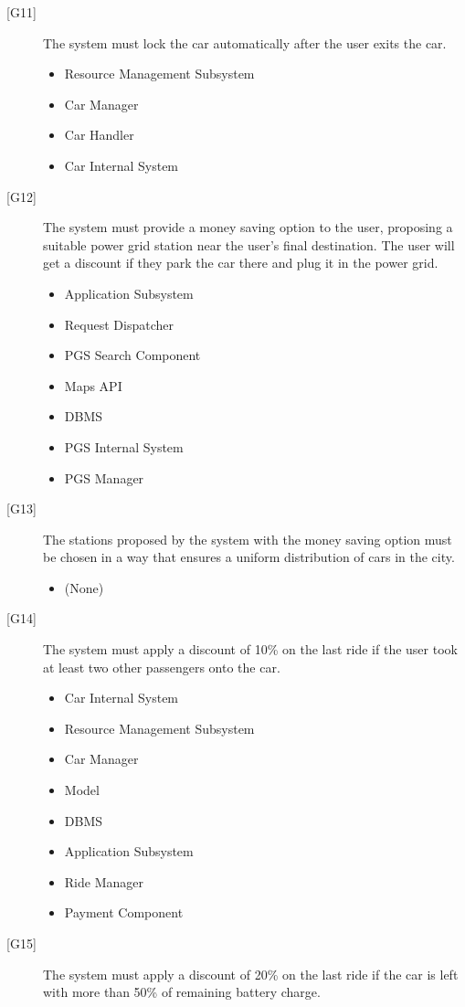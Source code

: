 \documentclass[english]{article}
\begin{document}
\begin{description}
\begin{itemize}
	\end{itemize}
	\item[{[G11]}]{The system must lock the car automatically after the user exits the car.}
	\begin{itemize}
		\item{Resource Management Subsystem}
		\item{Car Manager}
		\item{Car Handler}
		\item{Car Internal System}
	\end{itemize}
	\item[{[G12]}]{The system must provide a money saving option to the user, proposing a suitable power grid station near the user’s final destination. The user will get a discount if they park the car there and plug it in the power grid.}
	\begin{itemize}
		\item{Application Subsystem}
		\item{Request Dispatcher}
		\item{PGS Search Component}
		\item{Maps API}
		\item{DBMS}
		\item{PGS Internal System}
		\item{PGS Manager}
	\end{itemize}
	\item[{[G13]}]{The stations proposed by the system with the money saving option must be chosen in a way that ensures a uniform distribution of cars in the city.}
	\begin{itemize}
		\item{(None)}
	\end{itemize}
	\item[{[G14]}]{The system must apply a discount of 10\% on the last ride if the user took at least two other passengers onto the car.}
	\begin{itemize}
		\item{Car Internal System}
		\item{Resource Management Subsystem}
		\item{Car Manager}
		\item{Model}
		\item{DBMS}
		\item{Application Subsystem}
		\item{Ride Manager}
		\item{Payment Component}
	\end{itemize}
	\item[{[G15]}]{The system must apply a discount of 20\% on the last ride if the car is left with more than 50\% of remaining battery charge.}

\end{description}
\end{document}
